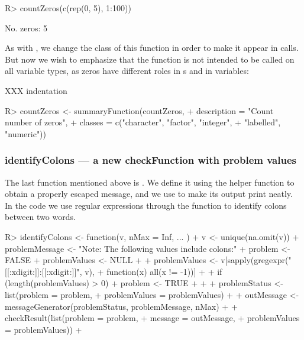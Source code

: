 \documentclass[article,shortnames]{jss}
\begin{document}
\begin{Schunk}
\begin{Sinput}
R> countZeros(c(rep(0, 5), 1:100))
\end{Sinput}
\begin{Soutput}
No. zeros: 5
\end{Soutput}
\end{Schunk}

As with , we change the class of this function in
order to make it appear in  calls. But now we
wish to emphasize that the function is not intended to be called on
all variable types, as zeros have different roles in s and in
 variables:

XXX indentation
\begin{Schunk}
\begin{Sinput}
R> countZeros <- summaryFunction(countZeros,
+    description = "Count number of zeros",
+    classes = c("character", "factor", "integer",
+    "labelled", "numeric"))
\end{Sinput}
\end{Schunk}

\subsubsection{identifyColons --- a new checkFunction with problem values}
The last function mentioned above is . We
define it using the helper function  to
obtain a properly escaped message, and we use  to
make its output print neatly. In the code we use regular expressions
through the  function to identify colons between two
words.

\begin{Schunk}
\begin{Sinput}
R> identifyColons <- function(v, nMax = Inf, ... ) {
+    v <- unique(na.omit(v))
+    problemMessage <- "Note: The following values include colons:"
+    problem <- FALSE
+    problemValues <- NULL
+  
+    problemValues <- v[sapply(gregexpr("[[:xdigit:]]:[[:xdigit:]]", v),
+                              function(x) all(x != -1))]
+  
+    if (length(problemValues) > 0) {
+      problem <- TRUE
+    }
+  
+    problemStatus <- list(problem = problem,
+                          problemValues = problemValues)
+  
+    outMessage <- messageGenerator(problemStatus, problemMessage, nMax)
+  
+    checkResult(list(problem = problem,
+                     message = outMessage,
+                     problemValues = problemValues))
+  }
\end{Sinput}
\end{Schunk}
\end{document}
